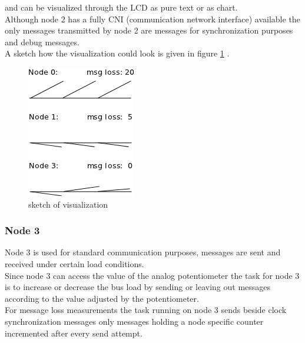 and can be visualized through the LCD as pure text or as chart.\\

Although node 2 has a fully CNI (communication network interface) available the only messages transmitted by node 2 are messages for synchronization purposes and debug messages.\\

A sketch how the visualization could look is given in figure \ref{fig:app:specification:node2} .

\begin{figure}[h]
 \centering
 \includegraphics[scale=0.8]{../images/app_visu_sketch.png}
 \caption{sketch of visualization}
 \label{fig:app:specification:node2}
\end{figure}


\subsubsection{Node 3}
\label{sec:app:specification:node3}

Node 3 is used for standard communication purposes, messages are sent and received under certain load conditions.\\

Since node 3 can access the value of the analog potentiometer the task for node 3 is to increase or decrease the bus load by sending or leaving out messages according to the value adjusted by the potentiometer.\\

For message loss measurements the task running on node 3 sends beside clock synchronization messages only messages holding a node specific counter incremented after every send attempt.\\ 
